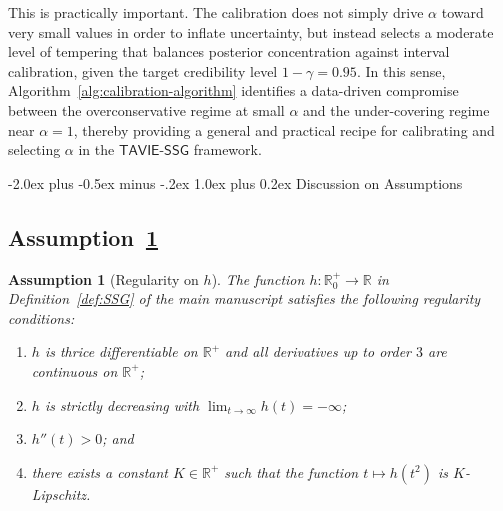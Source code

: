 \documentclass[12pt]{article}
\makeatletter
\def\section{\@startsection{section}{1}{\z@}
  {-2.0ex plus -0.5ex minus -.2ex} %
  {1.0ex plus 0.2ex}               %
  {\normalfont\Large\bfseries}}
\newtheorem{assumption}{Assumption}
\numberwithin{equation}{section}
\newcommand{\tssg}{\mathsf{TAVIE}\text{-}\mathsf{SSG}}
\makeatother
\begin{document}
{This is practically important. The calibration does not simply drive $\alpha$ toward very small values in order to inflate uncertainty, but instead selects a moderate level of tempering that balances posterior concentration against interval calibration, given the target credibility level $1-\gamma=0.95$. In this sense, Algorithm~\ref{alg:calibration-algorithm} identifies a data-driven compromise between the overconservative regime at small $\alpha$ and the under-covering regime near $\alpha=1$, thereby providing a general and practical recipe for calibrating and selecting $\alpha$ in the $\tssg$ framework.
}


\newpage


\section{Discussion on Assumptions}\label{sec:discussion-assumptions}

\subsection{\texorpdfstring{Assumption~\ref{ass:1}}{Assumption 1}}

\begin{assumption}[Regularity on $h$]
\label{ass:1}
The function $h: \mathbb{R}^{+}_{0}\to \mathbb{R}$ in Definition~\ref{def:SSG} of the main manuscript satisfies the following regularity conditions: 
\begin{enumerate}
    \item [(i)] {$h$ is thrice differentiable on $\mathbb{R}^{+}$ and all derivatives up to order $3$ are continuous on $\mathbb{R}^{+}$;}

    \item [(ii)] $h$ is strictly decreasing with $\lim_{t \rightarrow \infty} h(t) = -\infty$;

    \item [(iii)] $h''(t) > 0$; and

    \item [(iv)] there exists a constant $K\in \mathbb{R}^{+}$ such that the function $t \mapsto h(t^2)$ is $K$-Lipschitz. 
\end{enumerate}
\end{assumption}
\end{document}
